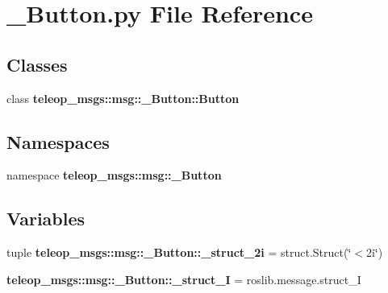 \section{\_\-Button.py File Reference}
\label{__Button_8py}
\subsection*{Classes}
\begin{DoxyCompactItemize}
\item 
class {\bf teleop\_\-msgs::msg::\_\-Button::Button}
\end{DoxyCompactItemize}
\subsection*{Namespaces}
\begin{DoxyCompactItemize}
\item 
namespace {\bf teleop\_\-msgs::msg::\_\-Button}
\end{DoxyCompactItemize}
\subsection*{Variables}
\begin{DoxyCompactItemize}
\item 
tuple {\bf teleop\_\-msgs::msg::\_\-Button::\_\-struct\_\-2i} = struct.Struct(\char`\"{}$<$2i\char`\"{})
\item 
{\bf teleop\_\-msgs::msg::\_\-Button::\_\-struct\_\-I} = roslib.message.struct\_\-I
\end{DoxyCompactItemize}
